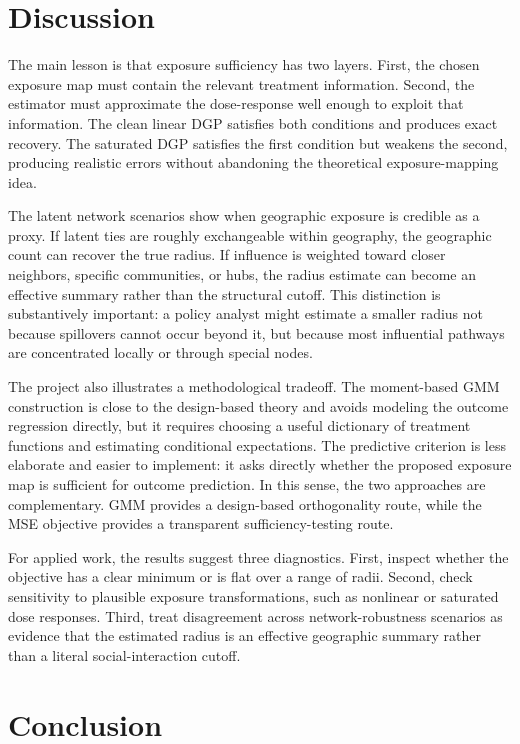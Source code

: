 \documentclass[11pt]{article}
\begin{document}
\section{Discussion}

The main lesson is that exposure sufficiency has two layers. First, the chosen exposure map must contain the relevant treatment information. Second, the estimator must approximate the dose-response well enough to exploit that information. The clean linear DGP satisfies both conditions and produces exact recovery. The saturated DGP satisfies the first condition but weakens the second, producing realistic errors without abandoning the theoretical exposure-mapping idea.

The latent network scenarios show when geographic exposure is credible as a proxy. If latent ties are roughly exchangeable within geography, the geographic count can recover the true radius. If influence is weighted toward closer neighbors, specific communities, or hubs, the radius estimate can become an effective summary rather than the structural cutoff. This distinction is substantively important: a policy analyst might estimate a smaller radius not because spillovers cannot occur beyond it, but because most influential pathways are concentrated locally or through special nodes.

The project also illustrates a methodological tradeoff. The moment-based GMM construction is close to the design-based theory and avoids modeling the outcome regression directly, but it requires choosing a useful dictionary of treatment functions and estimating conditional expectations. The predictive criterion is less elaborate and easier to implement: it asks directly whether the proposed exposure map is sufficient for outcome prediction. In this sense, the two approaches are complementary. GMM provides a design-based orthogonality route, while the MSE objective provides a transparent sufficiency-testing route.

For applied work, the results suggest three diagnostics. First, inspect whether the objective has a clear minimum or is flat over a range of radii. Second, check sensitivity to plausible exposure transformations, such as nonlinear or saturated dose responses. Third, treat disagreement across network-robustness scenarios as evidence that the estimated radius is an effective geographic summary rather than a literal social-interaction cutoff.

\section{Conclusion}
\end{document}
